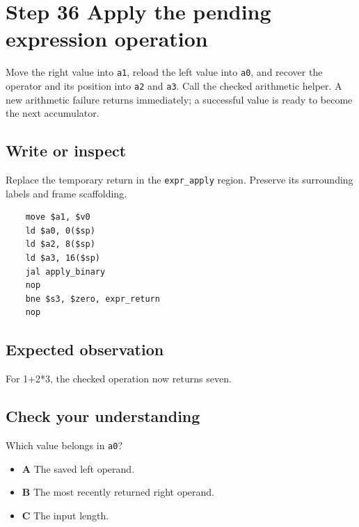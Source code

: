 \section{Step 36 Apply the pending expression operation}\label{expression-s36}

Move the right value into \texttt{a1}, reload the left value into \texttt{a0}, and recover the operator and its position into \texttt{a2} and \texttt{a3}. Call the checked arithmetic helper. A new arithmetic failure returns immediately; a successful value is ready to become the next accumulator.

\subsection{Write or inspect}
Replace the temporary return in the \texttt{expr\_apply} region. Preserve its surrounding labels and frame scaffolding.

\begin{verbatim}
    move $a1, $v0
    ld $a0, 0($sp)
    ld $a2, 8($sp)
    ld $a3, 16($sp)
    jal apply_binary
    nop
    bne $s3, $zero, expr_return
    nop
\end{verbatim}
\subsection{Expected observation}
For 1+2*3, the checked operation now returns seven.

\subsection{Check your understanding}
Which value belongs in \texttt{a0}?

\begin{itemize}
  \item \textbf{A} The saved left operand.
  \item \textbf{B} The most recently returned right operand.
  \item \textbf{C} The input length.
\end{itemize}
